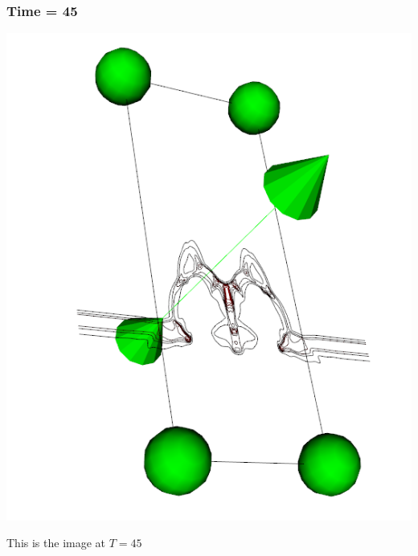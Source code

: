 \documentclass[11pt]{scrartcl}
\begin{document}
\subsubsection{Time = 45}
\begin{minipage}[t]{\linewidth}
{
\includegraphics[scale = 0.5]{img_4_45.png}

\centering
\medskip
{\footnotesize This is the image at $T = 45$}
}
\end{minipage}
\end{document}
